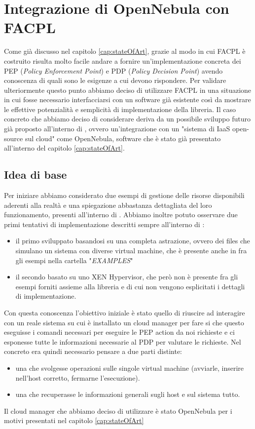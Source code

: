 
\chapter{Integrazione di OpenNebula con FACPL}
\label{cap:proposal}
Come già discusso nel capitolo \ref{cap:stateOfArt}, grazie al modo in cui FACPL\cite{facpl} è costruito risulta molto facile andare a fornire un'implementazione concreta dei PEP (\emph{Policy Enforcement Point}) e PDP (\emph{Policy Decision Point}) avendo conoscenza  di quali sono le esigenze a cui devono rispondere.\medbreak
Per validare ulteriormente questo punto abbiamo deciso di utilizzare FACPL in una situazione in cui fosse necessario interfacciarsi con un software già esistente così da mostrare le effettive potenzialità e semplicità di implementazione della libreria.
Il caso concreto che abbiamo deciso di considerare deriva da un possibile sviluppo futuro già proposto all'interno di \cite{10.1007/978-3-319-08260-8_6}, ovvero un'integrazione con un "sistema di IaaS open-source sul cloud" come OpenNebula\cite{opennebula}, software che è stato già presentato all'interno del capitolo \ref{cap:stateOfArt}.

\section{Idea di base}
Per iniziare abbiamo considerato due esempi di gestione delle risorse disponibili aderenti alla realtà e una spiegazione abbastanza dettagliata del loro funzionamento, presenti all'interno di \cite{10.1007/978-3-319-08260-8_6}.
Abbiamo inoltre potuto osservare due primi tentativi di implementazione descritti sempre all'interno di \cite{10.1007/978-3-319-08260-8_6}:
\begin{itemize}
    \item il primo sviluppato basandosi su una completa astrazione, ovvero dei files che simulano un sistema con diverse virtual machine, che è presente anche in \cite{facpl-github} fra gli esempi nella cartella "\emph{EXAMPLES}"
    \item il secondo basato su uno XEN Hypervisor, che però non è presente fra gli esempi forniti assieme alla libreria e di cui non vengono esplicitati i dettagli di implementazione.
\end{itemize}
Con questa conoscenza l'obiettivo iniziale è stato quello di riuscire ad interagire con un reale sistema su cui è installato un cloud manager per fare si che questo eseguisse i comandi necessari per eseguire le PEP action da noi richieste e ci esponesse tutte le informazioni necessarie al PDP per valutare le richieste.
Nel concreto era quindi necessario pensare a due parti distinte:
\begin{itemize}
    \item una che svolgesse operazioni sulle singole virtual machine (avviarle, inserire nell'host corretto, fermarne l'esecuzione).
    \item una che recuperasse le informazioni generali sugli host e sul sistema tutto.
\end{itemize}
Il cloud manager che abbiamo deciso di utilizzare è stato OpenNebula per i motivi presentati nel capitolo \ref{cap:stateOfArt}

